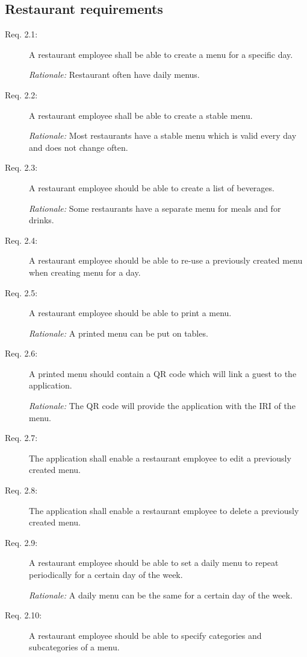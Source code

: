 \subsection{Restaurant requirements}
\begin{description}
    \item [Req. 2.1:] A restaurant employee shall be able to create a menu for a specific day.

    \emph{Rationale:} Restaurant often have daily menus.
    \item [Req. 2.2:] A restaurant employee shall be able to create a stable menu.

    \emph{Rationale:} Most restaurants have a stable menu which is valid every day and does not change often.
    \item [Req. 2.3:] A restaurant employee should be able to create a list of beverages.

    \emph{Rationale:} Some restaurants have a separate menu for meals and for drinks.
    \item [Req. 2.4:] A restaurant employee should be able to re-use a previously created menu when creating menu for a day.
    \item [Req. 2.5:] A restaurant employee should be able to print a menu.

    \emph{Rationale:} A printed menu can be put on tables.
    \item [Req. 2.6:] A printed menu should contain a QR code which will link a guest to the application.

    \emph{Rationale:} The QR code will provide the application with the IRI of the menu.
    \item [Req. 2.7:] The application shall enable a restaurant employee to edit a previously created menu.
    \item [Req. 2.8:] The application shall enable a restaurant employee to delete a previously created menu.
    \item [Req. 2.9:] A restaurant employee should be able to set a daily menu to repeat periodically for a certain day of the week.

    \emph{Rationale:} A daily menu can be the same for a certain day of the week.
    \item [Req. 2.10:] A restaurant employee should be able to specify categories and subcategories of a menu.


\end{description}
